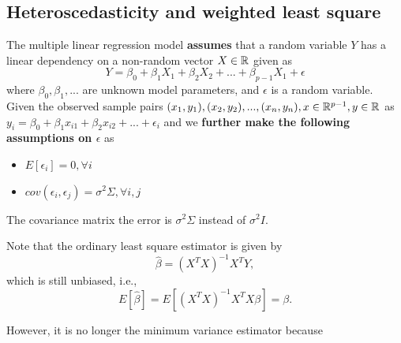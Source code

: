 \begin{refsection}
\subsection{Heteroscedasticity and weighted least square}
\begin{definition}
	The multiple linear regression model \textbf{assumes} that a random variable $Y$ has a linear dependency on a non-random vector $X \in \mathbb{R}$ given as
	$$Y = \beta_0 + \beta_1 X_1 +\beta_2 X_2 + ... +\beta_{p-1} X_1 + \epsilon$$
	where $\beta_0,\beta_1, ...$ are unknown model parameters, and $\epsilon$ is a random variable. 
	Given the observed sample pairs $(x_1,y_1),(x_2,y_2),..., (x_n,y_n), x\in \mathbb{R}^{p-1}, y\in \mathbb{R}$ as $y_i = \beta_0 + \beta_1 x_{i1} + \beta_2 x_{i2} + ... + \epsilon_i$ and we \textbf{further make the following assumptions on $\epsilon$} as
	\begin{itemize}
		\item $E[\epsilon_i] = 0,\forall i$
		\item $cov(\epsilon_i,\epsilon_j) = \sigma^2 \Sigma,\forall i,j$
	\end{itemize} 	
\end{definition}

\begin{remark}
The covariance matrix the error is $\sigma^2 \Sigma$ instead of $\sigma^2I$.	
\end{remark}

\begin{note}
Note that the ordinary least square estimator is given by
$$\hat{\beta} = (X^TX)^{-1}X^TY,$$
which is still unbiased, i.e., $$E[\hat{\beta}] = E[(X^TX)^{-1}X^TX\beta] = \beta.$$

However, it is no longer the minimum variance estimator because
	
\end{note}




\end{refsection}
